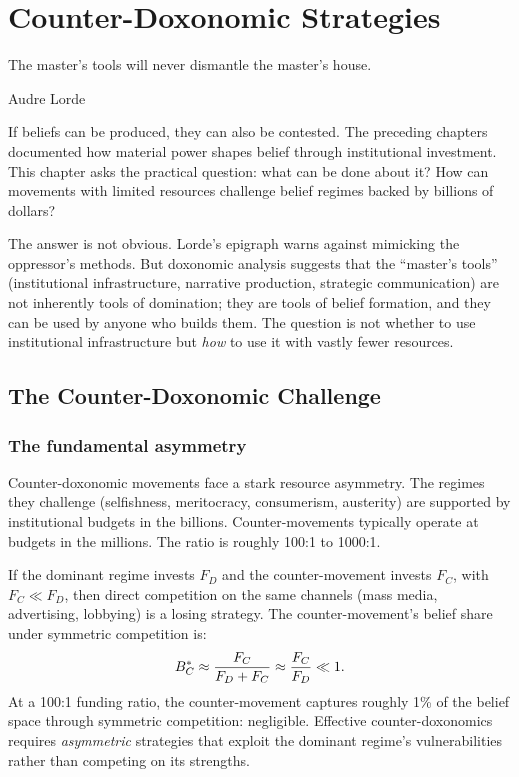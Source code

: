 \chapter{Counter-Doxonomic Strategies}
\label{ch:counter-doxonomic}

\epigraph{The master's tools will never dismantle the master's house.}{Audre Lorde}

\noindent
If beliefs can be produced, they can also be contested.
The preceding chapters documented how material power shapes belief through institutional investment.
This chapter asks the practical question: what can be done about it?
How can movements with limited resources challenge belief regimes backed by billions of dollars?

The answer is not obvious.
Lorde's epigraph warns against mimicking the oppressor's methods.
But doxonomic analysis suggests that the ``master's tools'' (institutional infrastructure, narrative production, strategic communication) are not inherently tools of domination; they are tools of belief formation, and they can be used by anyone who builds them.
The question is not whether to use institutional infrastructure but \emph{how} to use it with vastly fewer resources.

\section{The Counter-Doxonomic Challenge}
\label{sec:ch31-challenge}

\subsection{The fundamental asymmetry}

Counter-doxonomic movements face a stark resource asymmetry.
The regimes they challenge (selfishness, meritocracy, consumerism, austerity) are supported by institutional budgets in the billions.
Counter-movements typically operate at budgets in the millions.
The ratio is roughly 100:1 to 1000:1.

\begin{proposition}
\label{prop:resource-asymmetry}
If the dominant regime invests $F_D$ and the counter-movement invests $F_C$, with $F_C \ll F_D$, then direct competition on the same channels (mass media, advertising, lobbying) is a losing strategy.
The counter-movement's belief share under symmetric competition is:
\[
  B_{C}^* \approx \frac{F_C}{F_D + F_C} \approx \frac{F_C}{F_D} \ll 1.
\]
At a 100:1 funding ratio, the counter-movement captures roughly 1\% of the belief space through symmetric competition: negligible.
Effective counter-doxonomics requires \emph{asymmetric} strategies that exploit the dominant regime's vulnerabilities rather than competing on its strengths.
\end{proposition}

